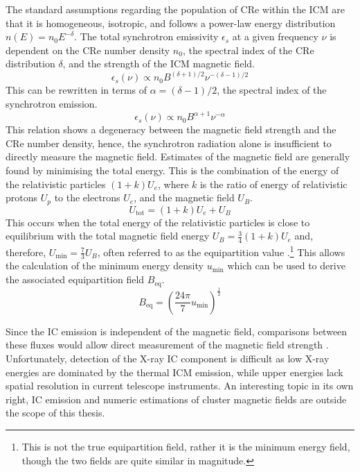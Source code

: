 The standard assumptions regarding the population of CRe within the ICM are that it is homogeneous, isotropic, and follows a power-law energy distribution $n(E) = n_0E^{-\delta}$. The total synchrotron emissivity $\epsilon_s$ at a given frequency $\nu$ is dependent on the CRe number density $n_0$, the spectral index of the CRe distribution $\delta$, and the strength of the ICM magnetic field.
\begin{equation}
    \epsilon_s(\nu) \propto n_0 B^{(\delta + 1)/2}\nu^{-(\delta - 1)/2}
\end{equation}
This can be rewritten in terms of $\alpha = (\delta - 1)/2$, the spectral index of the synchrotron emission.
\begin{equation}
    \epsilon_s(\nu) \propto n_0 B^{\alpha + 1}\nu^{-\alpha}
    \label{eq:synchro_general}
\end{equation}
This relation shows a degeneracy between the magnetic field strength and the CRe number density, hence, the synchrotron radiation alone is insufficient to directly measure the magnetic field. Estimates of the magnetic field are generally found by minimising the total energy. This is the combination of the energy of the relativistic particles $(1 + k)U_e$, where $k$ is the ratio of energy of relativistic protons $U_p$ to the electrons $U_e$, and the magnetic field $U_B$.
\begin{equation}
    U_{\mathrm{tot}} = (1+k)U_e + U_B
\end{equation}
This occurs when the total energy of the relativistic particles is close to equilibrium with the total magnetic field energy $U_B = \frac34(1+k)U_e$ and, therefore, $U_{\mathrm{min}} = \frac73 U_B$, often referred to as the equipartition value \citep{Govoni2004}.\footnote{This is not the true equipartition field, rather it is the minimum energy field, though the two fields are quite similar in magnitude.} This allows the calculation of the minimum energy density $u_{\mathrm{min}}$ which can be used to derive the associated equipartition field $B_{\mathrm{eq}}$. 
\begin{equation}
    B_{\mathrm{eq}} = \left(\frac{24\pi}{7}u_{\mathrm{min}}\right)^{\frac12}
\end{equation}

Since the IC emission is independent of the magnetic field, comparisons between these fluxes would allow direct measurement of the magnetic field strength \citep{Govoni2004, Wik2014}. Unfortunately, detection of the X-ray IC component is difficult as low X-ray energies are dominated by the thermal ICM emission, while upper energies lack spatial resolution in current telescope instruments. An interesting topic in its own right, IC emission and numeric estimations of cluster magnetic fields are outside the scope of this thesis.

